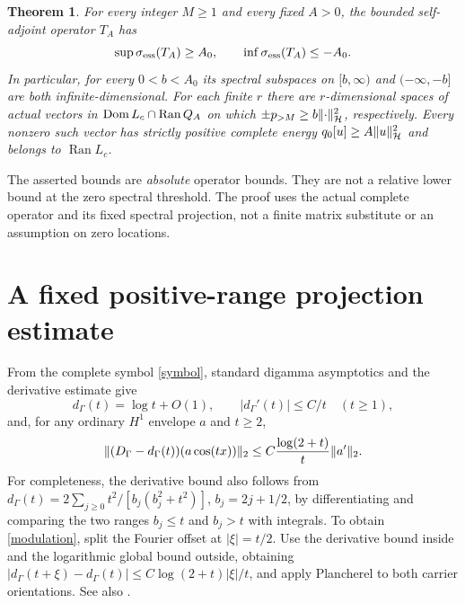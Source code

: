 \documentclass[11pt]{article}
\newtheorem{theorem}{Theorem}[section]
\begin{document}
\begin{theorem}\label{main}
For every integer $M\ge1$ and every fixed $A>0$, the bounded self-adjoint operator $T_A$ has
\begin{equation}\label{essbounds}
 \sup\sigma_{\rm ess}(T_A)\ge A_0,\qquad \inf\sigma_{\rm ess}(T_A)\le-A_0.
\end{equation}
In particular, for every $0<b<A_0$ its spectral subspaces on $[b,\infty)$ and $(-\infty,-b]$ are both infinite-dimensional. For each finite $r$ there are $r$-dimensional spaces of actual vectors in $\operatorname{Dom} L_c\cap\operatorname{Ran}Q_A$ on which $\pm p_{>M}\ge b\lVert\cdot\rVert_{\mathcal H}^2$, respectively. Every nonzero such vector has strictly positive complete energy $q_0[u]\ge A\lVert u\rVert_{\mathcal H}^2$ and belongs to $\operatorname{Ran}L_c$.
\end{theorem}
The asserted bounds are \emph{absolute} operator bounds. They are not a relative lower bound at the zero spectral threshold. The proof uses the actual complete operator and its fixed spectral projection, not a finite matrix substitute or an assumption on zero locations.

\section{A fixed positive-range projection estimate}\label{projection}
From the complete symbol \eqref{symbol}, standard digamma asymptotics and the derivative estimate give
\begin{equation}\label{modest}
 d_\Gamma(t)=\log t+O(1),\qquad |d_\Gamma'(t)|\le C/t\quad(t\ge1),
\end{equation}
and, for any ordinary $H^1$ envelope $a$ and $t\ge2$,
\begin{equation}\label{modulation}
 \lVert(D_\Gamma-d_\Gamma(t))(a\cos(tx))\rVert_2
 \le C\frac{\log(2+t)}t\lVert a'\rVert_2.
\end{equation}
For completeness, the derivative bound also follows from $d_\Gamma(t)=2\sum_{j\ge0}t^2/[b_j(b_j^2+t^2)]$, $b_j=2j+1/2$, by differentiating and comparing the two ranges $b_j\le t$ and $b_j>t$ with integrals. To obtain \eqref{modulation}, split the Fourier offset at $|\xi|=t/2$. Use the derivative bound inside and the logarithmic global bound outside, obtaining $|d_\Gamma(t+\xi)-d_\Gamma(t)|\le C\log(2+t)|\xi|/t$, and apply Plancherel to both carrier orientations. See also \cite{dlmf,modulationnote}.
\end{document}
